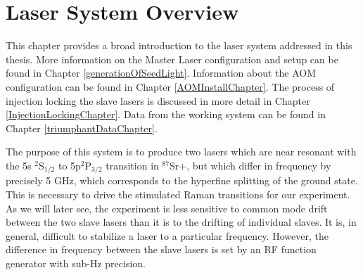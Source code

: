 \chapter{Laser System Overview}

This chapter provides a broad introduction to the laser system addressed in this thesis. More information on the Master Laser configuration and setup can be found in Chapter \ref{generationOfSeedLight}. Information about the AOM configuration can be found in Chapter \ref{AOMInstallChapter}. The process of injection locking the slave lasers is discussed in more detail in Chapter \ref{InjectionLockingChapter}. Data from the working system can be found in Chapter \ref{triumphantDataChapter}.

The purpose of this system is to produce two lasers which are near resonant with the 5s $^2$S$_{1/2}$ to 5p$^2$P$_{3/2}$ transition in $^{87}$Sr$+$, but which differ in frequency by precisely 5 GHz, which corresponds to the hyperfine splitting of the ground state. This is necessary to drive the stimulated Raman transitions for our experiment. As we will later see, the experiment is less sensitive to common mode drift between the two slave lasers than it is to the drifting of individual slaves. It is, in general, difficult to stabilize a laser to a particular frequency. However, the difference in frequency between the slave lasers is set by an RF function generator with sub-Hz precision.

